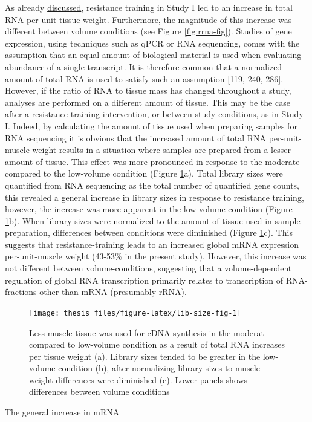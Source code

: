 \documentclass[twoside,10pt]{gihclass} %
\begin{document}
As already \protect\hyperlink{muscle-mass-growth}{discussed}, resistance training in Study I led to an increase in total RNA per unit tissue weight. Furthermore, the magnitude of this increase was different between volume conditions (see Figure \ref{fig:rrna-fig}).
Studies of gene expression, using techniques such as qPCR or RNA sequencing, comes with the assumption that an equal amount of biological material is used when evaluating abundance of a single transcript.
It is therefore common that a normalized amount of total RNA is used to satisfy such an assumption
{[}119, 240, 286{]}.
However, if the ratio of RNA to tissue mass has changed throughout a study, analyses are performed on a different amount of tissue. This may be the case after a resistance-training intervention, or between study conditions, as in Study I.
Indeed, by calculating the amount of tissue used when preparing samples for RNA sequencing it is obvious that the increased amount of total RNA per-unit-muscle weight results in a situation where samples are prepared from a lesser amount of tissue.
This effect was more pronounced in response to the moderate- compared to the low-volume condition (Figure \ref{fig:lib-size-fig}a).
Total library sizes were quantified from RNA sequencing as the total number of quantified gene counts, this revealed a general increase in library sizes in response to resistance training, however, the increase was more apparent in the low-volume condition
(Figure \ref{fig:lib-size-fig}b).
When library sizes were normalized to the amount of tissue used in sample preparation, differences between conditions were diminished
(Figure \ref{fig:lib-size-fig}c).
This suggests that resistance-training leads to an increased global mRNA expression per-unit-muscle weight (43-53\% in the present study). However, this increase was not different between volume-conditions, suggesting that a volume-dependent regulation of global RNA transcription primarily relates to transcription of RNA-fractions other than mRNA (presumably rRNA).
\begin{figure}

{\centering \texttt{[image: thesis\_files/figure-latex/lib-size-fig-1]} 

}

\caption[Muscle weight and RNA-seq library size]{Less muscle tissue was used for cDNA synthesis in the moderat- compared to low-volume condition as a result of total RNA increases per tissue weight (a). Library sizes tended to be greater in the low-volume condition (b), after normalizing library sizes to muscle weight differences were diminished (c). Lower panels shows differences between volume conditions}\label{fig:lib-size-fig}
\end{figure}
The general increase in mRNA
\end{document}
